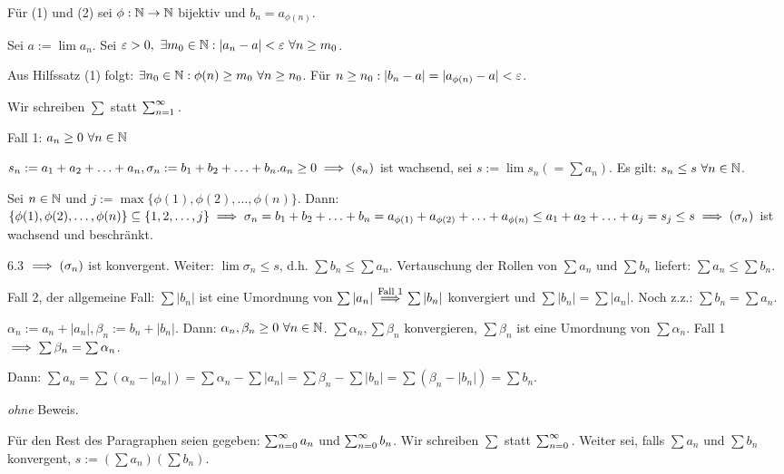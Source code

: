 \documentclass[a4paper,oneside,DIV15,BCOR12mm]{scrbook}
\begin{document}
\begin{beweis}
Für (1) und (2) sei $\phi: \mathbb{N} \to \mathbb{N}$ bijektiv und $b_n=a_{\phi(n)}$.
\begin{liste}
\item Sei $a:=\lim{a_n}$. Sei $\varepsilon>0,\ \exists m_0\in\mathbb{N}: |a_n-a|<\varepsilon\ \forall n \ge m_0$.

Aus Hilfssatz (1) folgt: $\exists n_0\in\mathbb{N}: \phi(n) \ge m_0\ \forall n \ge n_0$. Für $n \ge n_0: |b_n-a| = |a_{\phi(n)}-a| < \varepsilon$.

\item Wir schreiben $\sum$ statt $\sum_{n=1}^{\infty}{}$.

Fall 1: $a_n \ge 0\ \forall n\in\mathbb{N}$

$s_n:=a_1+a_2+\ldots+a_n, \sigma_n:=b_1+b_2+\ldots+b_n. a_n \ge 0 \implies (s_n)$ ist wachsend, sei $s:=\lim{s_n} (=\sum{a_n})$. Es gilt: $s_n \le s\ \forall n\in\mathbb{N}$.

Sei $n\in\mathbb{N}$ und $j:=\max\{\phi(1),\phi(2),\ldots,\phi(n)\}$. Dann: $\{\phi(1),\phi(2),\ldots,\phi(n)\} \subseteq \{1,2,\ldots,j\} \implies \sigma_n=b_1+b_2+\ldots+b_n = a_{\phi(1)}+a_{\phi(2)}+\ldots+a_{\phi(n)} \le a_1+a_2+\ldots+a_j = s_j \le s \implies (\sigma_n)$ ist wachsend und beschränkt.

6.3 $\implies (\sigma_n)$ ist konvergent. Weiter: $\lim{\sigma_n} \le s$, d.h. $\sum{b_n} \le \sum{a_n}$. Vertauschung der Rollen von $\sum{a_n}$ und $\sum{b_n}$ liefert: $\sum{a_n} \le \sum{b_n}$.

Fall 2, der allgemeine Fall: $\sum{|b_n|}$ ist eine Umordnung von $\sum{|a_n|} \overset{\text{Fall 1}}{\implies} \sum{|b_n|}$ konvergiert und $\sum{|b_n|} = \sum{|a_n|}$. Noch z.z.: $\sum{b_n} = \sum{a_n}$.

$\alpha_n := a_n+|a_n|, \beta_n := b_n+|b_n|$. Dann: $\alpha_n,\beta_n \ge 0\ \forall n\in\mathbb{N}$. $\sum{\alpha_n},\sum{\beta_n}$ konvergieren, $\sum{\beta_n}$ ist eine Umordnung von $\sum{\alpha_n}$. Fall 1 $\implies \sum{\beta_n} = \sum{\alpha_n}$.

Dann: $\sum{a_n} = \sum{(\alpha_n-|a_n|)} = \sum{\alpha_n} - \sum{|a_n|} = \sum{\beta_n} - \sum{|b_n|} = \sum{(\beta_n - |b_n|)} = \sum{b_n}$.

\item \emph{ohne} Beweis.
\end{liste}
\end{beweis}

\begin{vereinbarung}
Für den Rest des Paragraphen seien gegeben: $\sum_{n=0}^{\infty}{a_n}$ und $\sum_{n=0}^{\infty}{b_n}$. Wir schreiben $\sum$ statt $\sum_{n=0}^{\infty}{}$. Weiter sei, falls $\sum{a_n}$ und $\sum{b_n}$ konvergent, $s := (\sum{a_n})(\sum{b_n})$.
\end{vereinbarung}
\end{document}
